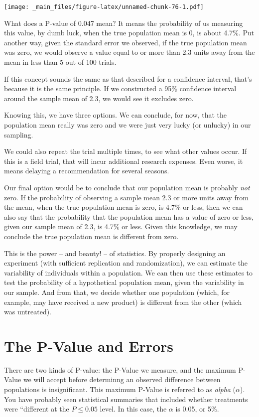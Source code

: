 \documentclass[
]{book}
\begin{document}
\texttt{[image: \_main\_files/figure-latex/unnamed-chunk-76-1.pdf]}

What does a P-value of 0.047 mean? It means the probability of us measuring this value, by dumb luck, when the true population mean is 0, is about 4.7\%. Put another way, given the standard error we observed, if the true population mean was zero, we would observe a value equal to or more than 2.3 units away from the mean in less than 5 out of 100 trials.

If this concept sounds the same as that described for a confidence interval, that's because it is the same principle. If we constructed a 95\% confidence interval around the sample mean of 2.3, we would see it excludes zero.

Knowing this, we have three options. We can conclude, for now, that the population mean really was zero and we were just very lucky (or unlucky) in our sampling.

We could also repeat the trial multiple times, to see what other values occur. If this is a field trial, that will incur additional research expenses. Even worse, it means delaying a recommendation for several seasons.

Our final option would be to conclude that our population mean is probably \emph{not} zero. If the probability of observing a sample mean 2.3 or more units away from the mean, when the true population mean is zero, is 4.7\% or less, then we can also say that the probability that the population mean has a value of zero or less, given our sample mean of 2.3, is 4.7\% or less. Given this knowledge, we may conclude the true population mean is different from zero.

This is the power -- and beauty! -- of statistics. By properly designing an experiment (with sufficient replication and randomization), we can estimate the variability of individuals within a population. We can then use these estimates to test the probability of a hypothetical population mean, given the variability in our sample. And from that, we decide whether one population (which, for example, may have received a new product) is different from the other (which was untreated).

\hypertarget{the-p-value-and-errors}{%
\section{The P-Value and Errors}\label{the-p-value-and-errors}}

There are two kinds of P-value: the P-Value we measure, and the maximum P-Value we will accept before determinng an observed difference between populations is insignificant. This maximum P-Value is referred to as \emph{alpha} (\(\alpha\)). You have probably seen statistical summaries that included whether treatments were ``different at the \(P \le 0.05\) level. In this case, the \(\alpha\) is 0.05, or 5\%.
\end{document}
